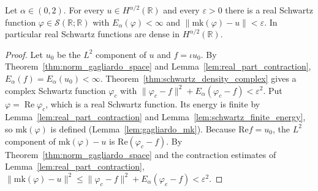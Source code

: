 \begin{theorem}\label{thm:schwartz_density_real}
\leanok
Let $\alpha \in (0, 2)$. For every $u \in H^{\alpha/2}(\mathbb{R})$ and every $\varepsilon > 0$ there is a real Schwartz function $\varphi \in \mathcal{S}(\mathbb{R}; \mathbb{R})$ with $E_\alpha(\varphi) < \infty$ and $\lVert \mathrm{mk}(\varphi) - u \rVert < \varepsilon$. In particular real Schwartz functions are dense in $H^{\alpha/2}(\mathbb{R})$.
\end{theorem}

\begin{proof}
\leanok
Let $u_0$ be the $L^2$ component of $u$ and $f = \iota u_0$. By Theorem~\ref{thm:norm_gagliardo_space} and Lemma~\ref{lem:real_part_contraction}, $E_\alpha(f) = E_\alpha(u_0) < \infty$. Theorem~\ref{thm:schwartz_density_complex} gives a complex Schwartz function $\varphi_c$ with $\lVert \varphi_c - f \rVert^2 + E_\alpha(\varphi_c - f) < \varepsilon^2$. Put $\varphi = \operatorname{Re} \varphi_c$, which is a real Schwartz function. Its energy is finite by Lemma~\ref{lem:real_part_contraction} and Lemma~\ref{lem:schwartz_finite_energy}, so $\mathrm{mk}(\varphi)$ is defined (Lemma~\ref{lem:gagliardo_mk}). Because $\mathrm{Re} f = u_0$, the $L^2$ component of $\mathrm{mk}(\varphi) - u$ is $\mathrm{Re}(\varphi_c - f)$. By Theorem~\ref{thm:norm_gagliardo_space} and the contraction estimates of Lemma~\ref{lem:real_part_contraction}, $\lVert \mathrm{mk}(\varphi) - u \rVert^2 \le \lVert \varphi_c - f \rVert^2 + E_\alpha(\varphi_c - f) < \varepsilon^2$.
\end{proof}

